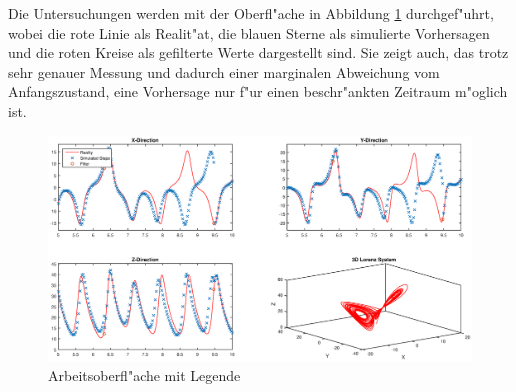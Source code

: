 \begin{refsection}
Die Untersuchungen werden mit der Oberfl"ache in Abbildung \ref{skript:Oberfl} durchgef"uhrt, wobei  die rote Linie als Realit"at, die blauen Sterne als simulierte Vorhersagen und die roten Kreise als gefilterte Werte dargestellt sind. Sie zeigt auch, das trotz sehr genauer Messung und dadurch einer marginalen Abweichung vom Anfangszustand, eine Vorhersage nur f"ur einen beschr"ankten Zeitraum m"oglich ist. 
\begin{figure}
\centering
\includegraphics[width=\hsize]{kalman/figures/3dsystemview.eps}
\caption{Arbeitsoberfl"ache mit Legende}
\label{skript:Oberfl}
\end{figure}


\end{refsection}
